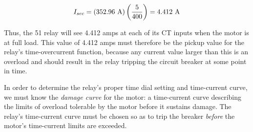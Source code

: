 $$I_{sec} = (352.96 \hbox{ A}) \left({5 \over 400}\right) = 4.412 \hbox{ A}$$

Thus, the 51 relay will see 4.412 amps at each of its CT inputs when the motor is at full load.  This value of 4.412 amps must therefore be the pickup value for the relay's time-overcurrent function, because any current value larger than this is an overload and should result in the relay tripping the circuit breaker at some point in time.

\vskip 10pt

In order to determine the relay's proper time dial setting and time-current curve, we must know the {\it damage curve} for the motor: a time-current curve describing the limits of overload tolerable by the motor before it sustains damage.  The relay's time-current curve must be chosen so as to trip the breaker {\it before} the motor's time-current limits are exceeded.










